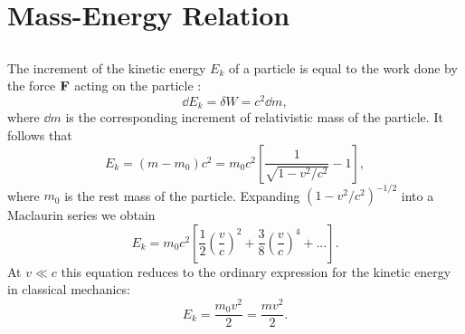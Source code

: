 \section{Mass-Energy Relation}
\label{sec-5.7}

\subsection{}\label{5.7.1} The increment of the kinetic energy $E_{k}$ of a particle is equal to the work done by the force $\vb{F}$ acting on the particle :
\begin{equation*}%
\dd E_{k} = \delta W= c^{2}\dd m,
\end{equation*}
where $\dd m$ is the corresponding increment of relativistic mass of the particle. It follows that
\begin{equation*}%
E_{k} = (m - m_{0})c^{2} = m_{0}c^{2} \left[ \frac{1}{\sqrt{1 - v^{2}/c^{2}}} - 1\right],
\end{equation*}
where $m_{0}$ is the rest mass of the particle. Expanding $(1 - v^{2}/c^{2})^{-1/2}$ into a Maclaurin series we obtain
\begin{equation*}%
E_{k} = m_{0}c^{2} \left[ \frac{1}{2} \left( \frac{v}{c}\right)^{2} + \frac{3}{8} \left( \frac{v}{c}\right)^{4} + \ldots \right].
\end{equation*}
At $v \ll c$ this equation reduces to the ordinary expression for the kinetic energy in classical mechanics:
\begin{equation*}%
E_{k} =  \frac{m_{0}v^{2}}{2} = \frac{mv^{2}}{2}.
\end{equation*}
